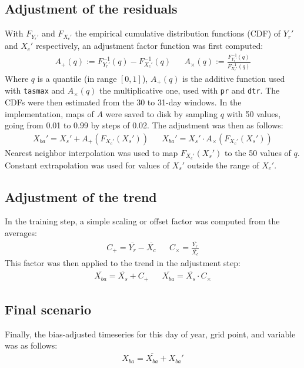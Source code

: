 \documentclass[letterpaper,10pt]{article}
\begin{document}
\subsection{Adjustment of the residuals}
With $F_{Y_r'}$ and $F_{X_c'}$ the empirical cumulative distribution functions (CDF) of $Y_r'$ and $X_c'$ respectively, an adjustment factor function was first computed:
\begin{align}
A_+(q) := F^{-1}_{Y_r'}\left(q\right) - F^{-1}_{X_c'}\left(q\right)  && A_\times(q) := \frac{F^{-1}_{Y_r'}\left(q\right)}{F^{-1}_{X_c'}\left(q\right)}
\end{align}
Where $q$ is a quantile (in range $[0, 1]$), $A_+(q)$ is the additive function used with \texttt{tasmax} and $A_\times(q)$ the multiplicative one, used with \texttt{pr} and \texttt{dtr}.
The CDFs were then estimated from the 30 to 31-day windows.
In the implementation, maps of $A$ were saved to disk by sampling $q$ with 50 values, going from 0.01 to 0.99 by steps of 0.02.
The adjustment was then as follows:
\begin{align}
X_{ba}' = X_s' + A_+\left(F_{X_c'}(X_s')\right) && X_{ba}' = X_s' \cdot A_\times\left(F_{X_c'}(X_s')\right)
\end{align}
Nearest neighbor interpolation was used to map $F_{X_c'}(X_s')$ to the 50 values of $q$.
Constant extrapolation was used for values of $X_s'$ outside the range of $X_c'$.

\subsection{Adjustment of the trend}
In the training step, a simple scaling or offset factor was computed from the averages:
\begin{align}
C_+ = \overline{Y_r} - \overline{X_c} && C_\times = \frac{\overline{Y_r}}{\overline{X_c}}
\end{align}
This factor was then applied to the trend in the adjustment step:
\begin{align}
\overline{X_{ba}} = \overline{X_s} + C_+  && \overline{X_{ba}} = \overline{X_s}\cdot C_\times
\end{align}

\subsection{Final scenario}
Finally, the bias-adjusted timeseries for this day of year, grid point, and variable was as follows:
\begin{align}
X_{ba} = \overline{X_{ba}} + X_{ba}'
\end{align}
\end{document}
